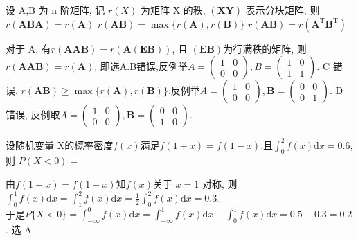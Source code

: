 \documentclass[kindlepaper]{BHCexam4kindle}
\begin{document}
\begin{questions}
		\qs 设 A,B 为 n 阶矩阵, 记 $r(X)$ 为矩阵 X 的秩, $(\boldsymbol{X} \boldsymbol{Y})$ 表示分块矩阵, 则\xx
		{$r(\boldsymbol{A} \boldsymbol{B} \boldsymbol{A})=r(\boldsymbol{A})$}
		{$r(\boldsymbol{A} \boldsymbol{B})=\max \{r(\boldsymbol{A}), r(\boldsymbol{B})\}$}
		{$r(\boldsymbol{A} \boldsymbol{B})=r\left(\boldsymbol{A}^{\mathrm{T}} \boldsymbol{B}^{\mathrm{T}}\right)$}
		\begin{solution}
			对于 A, 有$r(\boldsymbol{A} \boldsymbol{A} \boldsymbol{B})=r(\boldsymbol{A}(\boldsymbol{E} \boldsymbol{B}))$,
			且 $(\boldsymbol{E} \boldsymbol{B})$为行满秩的矩阵, 则 $r(\boldsymbol{A} \boldsymbol{A} \boldsymbol{B})=r(\boldsymbol{A})$,
			即选A.B错误,反例举$A=\left(\begin{array}{ll}{1} & {0} \\ {0} & {0}\end{array}\right), B=\left(\begin{array}{ll}{1} & {0} \\ {1} & {1}\end{array}\right)$. C 错误,
				$r(\boldsymbol{A} \boldsymbol{B}) \geqslant \max \{r(\boldsymbol{A}), r(\boldsymbol{B})\}$,反例举$A=\left(\begin{array}{ll}{1} & {0} \\ {0} & {0}\end{array}\right), \boldsymbol{B}=\left(\begin{array}{ll}{0} & {0} \\ {0} & {1}\end{array}\right)$. D 错误, 反例取$A=\left(\begin{array}{ll}{1} & {0} \\ {0} & {0}\end{array}\right), \boldsymbol{B}=\left(\begin{array}{ll}{0} & {0} \\ {1} & {0}\end{array}\right)$.
		\end{solution}

		\qs 设随机变量 X的概率密度$f(x)$满足$f(1+x)=f(1-x)$,且$\int_{0}^{2} f(x) \mathrm{d} x=0.6$,则
		$P(X<0)=$\xx
		\begin{solution}
			由$f(1+x)=f(1-x)$知$f(x)$关于 $x = 1$ 对称, 则\\
			$\int_{0}^{1} f(x) \mathrm{d} x=\int_{1}^{2} f(x) \mathrm{d} x=\frac{1}{2} \int_{0}^{2} f(x) \mathrm{d} x=0.3$.\\
			于是$P\{X<0\}=\int_{-\infty}^{0} f(x) \mathrm{d} x=\int_{-\infty}^{1} f(x) \mathrm{d} x-\int_{0}^{1} f(x) \mathrm{d} x=0.5-0.3=0.2$. 选 A.
		\end{solution}


\end{questions}
\end{document}
